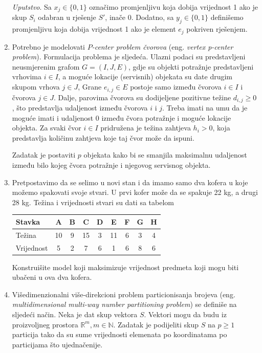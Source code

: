 \documentclass[b5paper, utf8, 11pt, colorlinks]{book}
\theoremstyle{definition}
\begin{document}
\begin{enumerate}
	\emph{Uputstvo}. Sa $x_j \in \{0, 1\}$ označimo promjenljivu koja dobija vrijednost 1 ako je skup $S_i$ odabran u rješenje $S'$, inače 0. Dodatno, sa $y_j \in \{0, 1 \}$ definišemo promjenljivu koja dobija vrijednost 1 ako je   element $e_j$ pokriven rješenjem.  
	\item Potrebno je modelovati \emph{$P$-center problem čvorova} (eng. \emph{vertex p-center problem}). Formulacija problema je sljedeća. Ulazni podaci su predstavljeni neusmjerenim grafom $G = (I, J, E)$, gdje su objekti potražnje predstavljeni  vrhovima $i\in I$, a moguće lokacije (servisnih) objekata su date   drugim skupom vrhova $j \in J$, Grane $e_{i,j} \in E$ postoje samo između čvorova $i \in  I$ i čvorova $j \in J$. Dalje, parovima čvorova su dodijeljene pozitivne težine $d_{i,j}\geq 0$, što predstavlja udaljenost između čvorova $i$ i $j$. Treba imati na umu da je moguće imati i udaljenost 0 između čvora potražnje i moguće lokacije objekta. Za svaki čvor $i \in I$ pridružena je težina zahtjeva $h_i>0$, koja predstavlja količinu zahtjeva koje taj čvor može da ispuni. 
	
	Zadatak je postaviti $p$ objekata kako bi se smanjila maksimalnu udaljenost između bilo kojeg čvora potražnje i	njegovog servisnog objekta. 
	\item %
	Pretpostavimo da se selimo u novi stan i da imamo samo dva kofera u koje možemo spakovati svoje stvari. U prvi kofer može da se spakuje 22 kg, a drugi 28 kg. Težina i vrijednosti stvari
	su dati sa tabelom
	\begin{table}[H]
		\centering
		\begin{tabular}{l|cccccccc}
			Stavka & A & B & C & D & E & F & G & H \\ \hline
			Težina & 10 & 9 & 15 & 3 & 11 & 6 & 3 & 4 \\
			Vrijednost & 5 & 2 & 7 & 6 & 1 & 6 & 8 & 6 \\ \hline
		\end{tabular} 
		
	\end{table}
	Konstruišite model koji maksimizuje vrijednost  predmeta koji mogu biti ubačeni u ova dva kofera. 
	\item Višedimenzionalni više-direkcioni problem particionisanja brojeva (eng. \emph{multidimensional multi-way number partitioning problem}) se definiše na sljedeći način. Neka je dat skup vektora $S$. Vektori mogu da budu iz proizvoljneg prostora $\mathbb{R}^m, m \in \mathbb{N}$.   Zadatak je podijeliti skup $S$ na $p \geq 1$ particija tako da su sume vrijednosti  elemenata  po koordinatama po particijama što ujednačenije. 
	

\end{enumerate}
\end{document}

